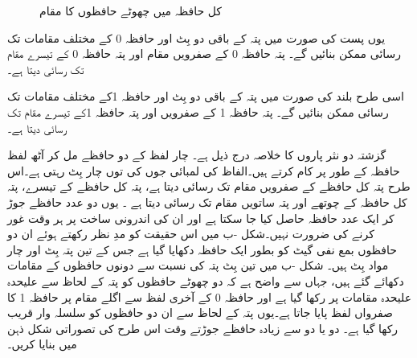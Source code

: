 \begin{figure}
\begin{subfigure}{1\textwidth}
\caption{}
\end{subfigure}
\caption{کل حافظہ میں چھوٹے حافظوں کا مقام}
\label{شکل_حافظہ_کل_میں_چھوٹے_کا_مقام}
\end{figure}

یوں پست  کی صورت میں پتہ کے باقی دو بِٹ  اور  حافظہ 0 کے مختلف مقامات تک رسائی ممکن بنائیں گے۔ پتہ  حافظہ 0 کے صفرویں مقام اور پتہ  حافظہ 0 کے تیسرے مقام تک رسائی دیتا ہے۔

اسی طرح بلند  کی صورت میں پتہ کے باقی دو بِٹ  اور  حافظہ 1کے مختلف مقامات تک رسائی ممکن بنائیں گے۔ پتہ  حافظہ 1 کے صفرویں اور پتہ  حافظہ 1کے تیسرے مقام تک رسائی دیتا ہے۔


گزشتہ دو نثر پاروں کا خلاصہ درج ذیل ہے۔  چار لفظ  کے دو حافظے مل کر  آٹھ لفظ   حافظہ کے طور پر کام کرتے ہیں۔الفاظ کی لمبائی جوں کی توں چار بِٹ رہتی ہے۔اس طرح پتہ  کل حافظے کے صفرویں مقام تک رسائی دیتا ہے، پتہ  کل حافظے کے تیسرے، پتہ  کل حافظہ کے چوتھے اور پتہ  ساتویں مقام تک رسائی دیتا ہے ۔ یوں دو عدد حافظے جوڑ کر ایک عدد حافظہ حاصل کیا جا سکتا ہے اور ان کی اندرونی ساخت پر ہر وقت غور کرنے کی ضرورت نہیں۔شکل  -ب میں اس حقیقت کو مدِ نظر رکھتے ہوئے ان دو حافظوں بمع نفی گیٹ کو بطور ایک  حافظہ دکھایا گیا ہے جس کے تین پتہ بِٹ اور چار مواد بِٹ ہیں۔ شکل  -ب میں تین بِٹ پتہ کی نسبت سے دونوں حافظوں کے مقامات دکھائے گئے ہیں، جہاں  سے واضح ہے کہ دو چھوٹے حافظوں کو پتہ کے لحاظ سے علیحدہ علیحدہ مقامات پر رکھا گیا ہے اور حافظہ 0 کے آخری لفظ  سے اگلے مقام پر حافظہ 1 کا صفرواں لفظ پایا جاتا ہے۔یوں پتہ کے لحاظ سے ان دو حافظوں کو سلسلہ وار قریب رکھا گیا ہے۔ دو یا دو سے زیادہ حافظے جوڑتے وقت اس طرح کی تصوراتی شکل ذہن میں بنایا کریں۔
	
